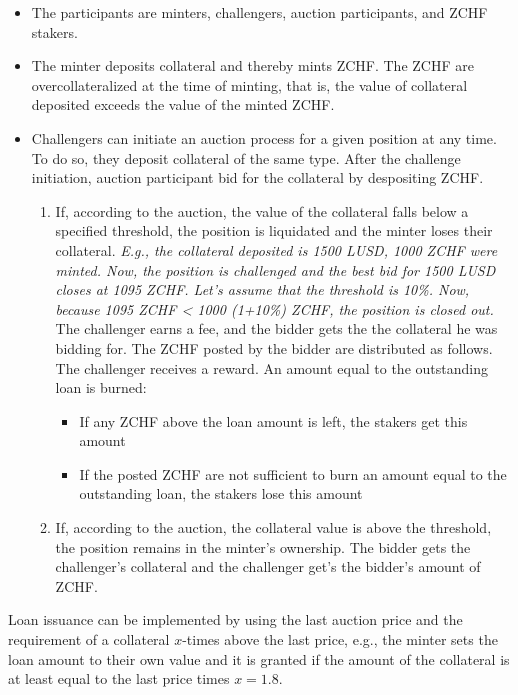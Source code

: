 \documentclass[english,11pt]{article}
\begin{document}
\begin{itemize}
\item The participants are minters, challengers, auction participants, and ZCHF stakers.
\item The minter deposits collateral and thereby mints ZCHF. The ZCHF are overcollateralized at the time
of minting, that is, the value of collateral deposited exceeds the value of the minted ZCHF.
\item Challengers can initiate an auction process for a given position at any time.
To do so, they deposit collateral of the same type. 
After the challenge initiation, auction participant bid for the collateral by despositing
ZCHF.
\begin{enumerate}
\item If, according to the auction, the value of the collateral falls below a specified threshold, the position is liquidated
and the minter loses their collateral. \emph{E.g., the collateral deposited is 1500 LUSD, 1000 ZCHF were minted. Now, the position
is challenged and the best bid for 1500 LUSD closes at 1095 ZCHF. Let's assume that the threshold is 10\%. Now, because 
1095 ZCHF < 1000 (1+10\%) ZCHF, the position is closed out.}
The challenger earns a fee, and the bidder gets the the collateral he was bidding for.
The ZCHF posted by the bidder are distributed as follows. The challenger
receives a reward. An amount equal to the outstanding loan is burned:
\begin{itemize}
\item If any ZCHF above the loan amount is left, the stakers get this amount
\item If the posted ZCHF are not sufficient to burn an amount equal to the outstanding loan,
the stakers lose this amount
\end{itemize}
\item If, according to the auction, the collateral value is above the threshold, the position remains in the minter's ownership. The bidder gets the challenger's collateral and
the challenger get's the bidder's amount of ZCHF.
\end{enumerate}
\end{itemize}

Loan issuance can be implemented by using the last auction price and the requirement of 
a collateral $x$-times above the last price, e.g., the minter sets the loan amount to their own value
and it is granted if the amount of the collateral is at least equal to the last price times $x=1.8$.
\end{document}

